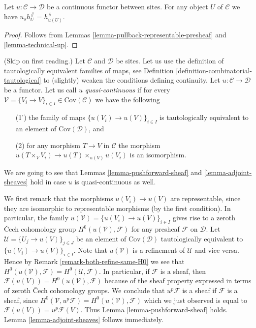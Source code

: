 \begin{lemma}
\label{lemma-pullback-representable-sheaf}
Let $u : \mathcal{C} \to \mathcal{D}$ be a continuous functor
between sites.
For any object $U$ of $\mathcal{C}$ we have $u_sh_U^\# = h_{u(U)}^\#$.
\end{lemma}

\begin{proof}
Follows from
Lemmas \ref{lemma-pullback-representable-presheaf}
and \ref{lemma-technical-up}.
\end{proof}


\begin{remark}
\label{remark-quasi-continuous}
(Skip on first reading.)
Let $\mathcal{C}$ and $\mathcal{D}$ be sites. Let us
use the definition of tautologically equivalent families of maps,
see Definition \ref{definition-combinatorial-tautological}
to (slightly) weaken the conditions defining continuity.
Let $u : \mathcal{C} \to \mathcal{D}$ be a functor.
Let us call $u$ {\it quasi-continuous} if for every
$\mathcal{V} = \{V_i \to V\}_{i\in I} \in \text{Cov}(\mathcal{C})$
we have the following
\begin{enumerate}
\item[(1')] the family of maps
$\{u(V_i) \to u(V)\}_{i\in I}$ is tautologically equivalent
to an element of $\text{Cov}(\mathcal{D})$, and
\item[(2)] for any morphism $T \to V$ in $\mathcal{C}$ the morphism
$u(T \times_V V_i) \to u(T) \times_{u(V)} u(V_i)$ is an isomorphism.
\end{enumerate}
We are going to see that Lemmas \ref{lemma-pushforward-sheaf}
and \ref{lemma-adjoint-sheaves} hold in case
$u$ is quasi-continuous as well.

\medskip\noindent
We first remark that the morphisms $u(V_i) \to u(V)$ are representable, since
they are isomorphic to representable morphisms (by the first condition).
In particular, the family $u(\mathcal{V}) = \{u(V_i) \to u(V)\}_{i\in I}$
gives rise to a zeroth {\v C}ech cohomology group
$H^0(u(\mathcal{V}), \mathcal{F})$ for any presheaf $\mathcal{F}$ on
$\mathcal{D}$.
Let $\mathcal{U} = \{U_j \to u(V)\}_{j \in J}$ be an element
of $\text{Cov}(\mathcal{D})$ tautologically
equivalent to $\{u(V_i) \to u(V)\}_{i \in I}$. Note that $u(\mathcal{V})$
is a refinement of $\mathcal{U}$ and vice versa. Hence by Remark
\ref{remark-both-refine-same-H0} we see that
$H^0(u(\mathcal{V}), \mathcal{F}) = H^0(\mathcal{U}, \mathcal{F})$.
In particular, if $\mathcal{F}$ is a sheaf, then
$\mathcal{F}(u(V)) = H^0(u(\mathcal{V}), \mathcal{F})$ because
of the sheaf property expressed in terms of zeroth {\v C}ech cohomology
groups. We conclude that $u^p\mathcal{F}$ is a sheaf if $\mathcal{F}$
is a sheaf, since $H^0(\mathcal{V}, u^p\mathcal{F}) =
H^0(u(\mathcal{V}), \mathcal{F})$ which we just observed is
equal to $\mathcal{F}(u(V)) = u^p\mathcal{F}(V)$. Thus Lemma
\ref{lemma-pushforward-sheaf} holds. Lemma \ref{lemma-adjoint-sheaves}
follows immediately.
\end{remark}






